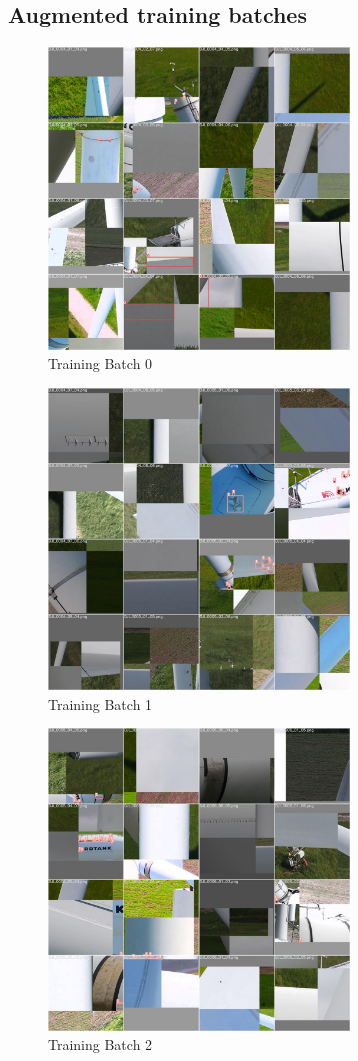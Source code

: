 \documentclass[conference]{IEEEtran}
\begin{document}
\subsection{Augmented training batches}
\begin{figure}[H]
    \centering
    \includegraphics[width=8cm]{Images/YOLOv5s/train_batch0.jpg}
    \caption{Training Batch 0}
\end{figure}
\begin{figure}[H]
    \centering
    \includegraphics[width=8cm]{Images/YOLOv5s/train_batch1.jpg}
    \caption{Training Batch 1}
\end{figure}
\begin{figure}[H]
    \centering
    \includegraphics[width=8cm]{Images/YOLOv5s/train_batch2.jpg}
    \caption{Training Batch 2}
\end{figure}
\end{document}
